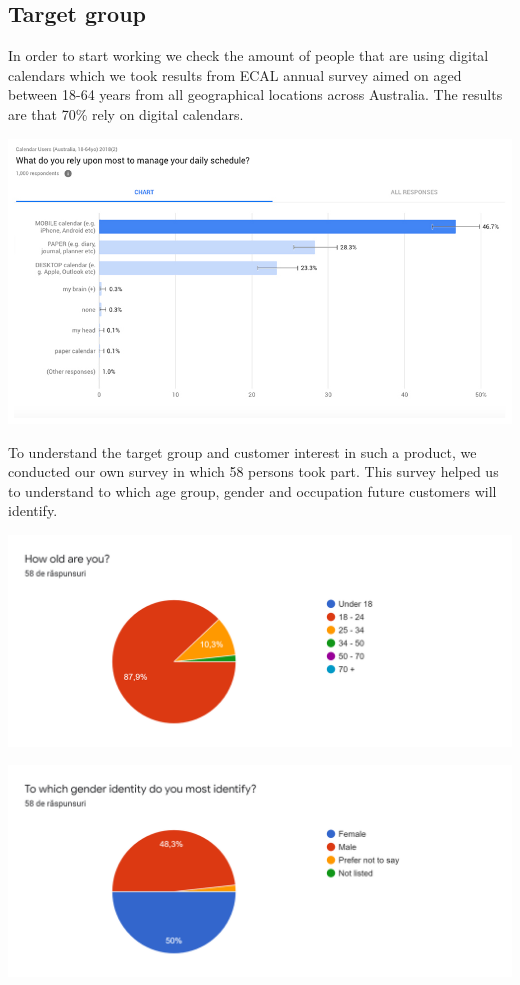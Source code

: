 \subsection{Target group}
\par In order to start working we check the amount of people that are using digital calendars which we took results from ECAL annual survey aimed on aged between 18-64 years from all geographical locations across Australia. The results are that 70\% rely on digital calendars. 
\par 
\includegraphics[width=\textwidth]{General_CalendarUsage_Statistic}
\par To understand the target group and customer interest in such a product, we conducted our own survey in which 58 persons took part. This survey helped us to understand to which age group, gender and occupation future customers will identify.    
\par
\includegraphics[width=\textwidth]{TargetGroup1}
\par
\includegraphics[width=\textwidth]{TargetGroup2}
